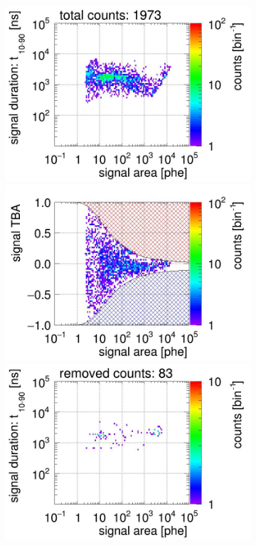 \begin{landscape}
	\begin{figure}[!p]\ContinuedFloat
	\centering
	\begin{subfigure}[t]{0.32\textwidth} %
		\centering
		\includegraphics[width=\figurewidth,clip,trim={0 98 0 15}]{Figures/GasTest/CutsValid/res64767/pdpa11Vecfig64767.jpg}
		\includegraphics[width=\figurewidth,clip,trim={0 98 0 40}]{Figures/GasTest/CutsValid/res64767/tbapa11Vecfig64767.jpg}
		\includegraphics[width=\figurewidth,clip,trim={0 98 0 15}]{Figures/GasTest/CutsValid/res64767/pdpaX11Vecfig64767.jpg}

\end{subfigure}
\end{figure}
\end{landscape}
